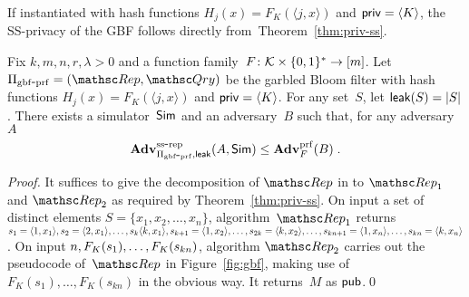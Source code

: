 If instantiated with hash functions $H_j(x) = F_K(\langle j,x \rangle)$ and ${\sf priv} = \langle K \rangle$, the SS-privacy of the GBF follows directly from~Theorem~\ref{thm:priv-ss}.
\begin{theorem}
\label{thm:gbf-prf-privacy}
Fix $k,m,n,r,\lambda>0$ and a function family~$F\colon {\cal K} \times \{0,1\}^* \to [m]$.  Let $\setprim_{\mathrm{gbf\mbox{-}prf}}= (\Rep, \Qry)$ be the garbled Bloom filter with hash functions $H_j(x)=F_K(\langle j,x \rangle)$ and ${\sf priv}=\langle K \rangle$.  For any set~$S$, let ${\sf leak}(S)=|S|$.  There exists a simulator~${\sf Sim}$ and an adversary~$B$ such that, for any adversary~$A$
\[
\mathrm{\mathbf{Adv}}^{\mathrm{ss\mbox{-}rep}}_{\Pi_{\mathrm{gbf\mbox{-}prf}},{\sf leak}}(A,{\sf Sim}) \leq  \mathbf{Adv}^{\mathrm{prf}}_{F}(B)\;.
\]
\end{theorem}
\begin{proof}
It suffices to give the decomposition of $\Rep$ in to $\Rep_1$ and $\Rep_2$ as required by Theorem~\ref{thm:priv-ss}.
On input a set of distinct elements $S=\{x_1,x_2,\ldots,x_n\}$, algorithm~$\Rep_1$ returns $s_1=\langle 1,x_1 \rangle, s_2=\langle 2,x_1 \rangle, \ldots, s_k\langle k,x_1\rangle, s_{k+1}=\langle 1,x_2\rangle, \ldots,\linebreak s_{2k}=\langle k,x_2\rangle, \ldots ,s_{kn+1}=\langle 1,x_n\rangle, \ldots, s_{kn}=\langle k,x_n \rangle$.  On input $n,F_K(s_1),\ldots,\linebreak F_K(s_{kn})$, algorithm $\Rep_2$ carries out the pseudocode of~$\Rep$ in Figure~\ref{fig:gbf}, making use of $F_K(s_1),\ldots,F_K(s_{kn})$ in the obvious way.  It returns~$M$ as ${\sf pub}$.\hfill\qed
\end{proof}


